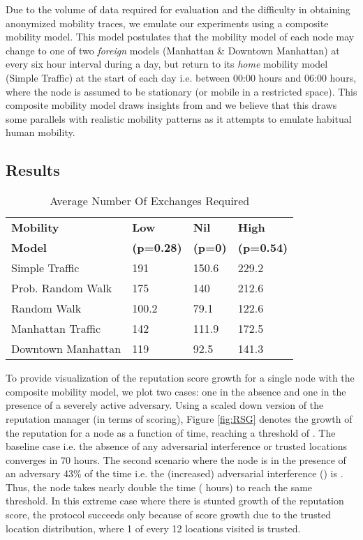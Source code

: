 \documentclass[letterpaper,twocolumn]{sig-alternate}
\begin{document}
Due to the volume of data required for evaluation and the difficulty in obtaining anonymized mobility traces, we emulate our experiments using a composite mobility model. This model postulates that the mobility model of each node may change to one of two {\em foreign} models (Manhattan \& Downtown Manhattan) at every six hour interval during a day, but return to its {\em home} mobility model (Simple Traffic) at the start of each day i.e. between 00:00 hours and 06:00 hours, where the node is assumed to be stationary (or mobile in a restricted space). This composite mobility model draws insights from \cite{isaacman2012human,becker2013human,song2010limits,musolesi2007designing} and we believe that this draws some parallels with realistic mobility patterns as it attempts to emulate habitual human mobility. 


\subsection{Results}
\label{results}



\begin{table}[H]
\centering
\begin{tabular}{| l | l | l | l |}
\hline 
\textbf{Mobility} & \textbf{Low} & \textbf{Nil}& \textbf{High}\\ 
\textbf{Model} & \textbf{(p=0.28)} & \textbf{(p=0)}& \textbf{(p=0.54)}\\ 
\hline

 Simple Traffic & 191 & 150.6 & 229.2\\ 
 \hline
 Prob. Random Walk & 175 & 140 & 212.6\\ 
 \hline
 Random Walk & 100.2 & 79.1 & 122.6\\ 
 \hline
 Manhattan Traffic & 142 & 111.9 & 172.5\\ 
 \hline
 Downtown Manhattan & 119 & 92.5 & 141.3\\ 
 \hline
\end{tabular}
\caption {Average Number Of Exchanges Required}
\label{table:avg}
\end{table}

 To provide visualization of the reputation score growth for a single node with the composite mobility model, we plot two cases: one in the absence and one in the presence of a severely active adversary. Using a scaled down version of the reputation manager (in terms of scoring), Figure \ref{fig:RSG} denotes the growth of the reputation for a node as a function of time, reaching a threshold of . The baseline case i.e. the absence of any adversarial interference or trusted locations converges in 70 hours. The second scenario where the node is in the presence of an adversary 43\% of the time i.e. the (increased) adversarial interference () is . Thus, the node takes nearly double the time ( hours) to reach the same threshold. In this extreme case where there is stunted growth of the reputation score, the protocol succeeds only because of score growth due to the trusted location distribution, where 1 of every 12 locations visited is trusted. 
\end{document}
